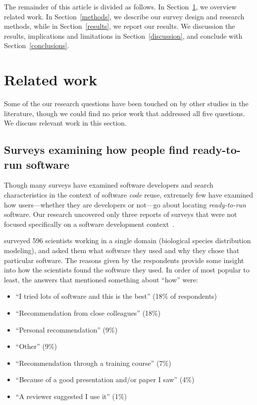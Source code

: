 \documentclass[review]{elsarticle}
\begin{document}
The remainder of this article is divided as follows. In Section~\ref{related-work}, we overview related work.  In Section~\ref{methods}, we describe our survey design and research methods, while in Section~\ref{results}, we report our results.  We discussion the results, implications and limitations in Section~\ref{discussion}, and conclude with Section~\ref{conclusions}.


\section{Related work}
\label{related-work}

Some of the our research questions have been touched on by other studies in the literature, though we could find no prior work that addressed all five questions.  We discuss relevant work in this section.


\subsection{Surveys examining how people find ready-to-run software}

Though many surveys have examined software developers and search characteristics in the context of software \emph{code} reuse, extremely few have examined how users---whether they are developers or not---go about locating \emph{ready-to-run} software.  Our research uncovered only three reports of surveys that were not focused specifically on a software development context~\citep{joppa2013troubling, huang2013provenance, lawrence2015science}.

\citet{joppa2013troubling} surveyed 596 scientists working in a single domain (biological species distribution modeling), and asked them what software they used and why they chose that particular software.  The reasons given by the respondents provide some insight into how the scientists found the software they used.  In order of most popular to least, the answers that mentioned something about ``how'' were:

\begin{itemize}[itemsep=-0.5ex]

\item ``I tried lots of software and this is the best'' (18\% of respondents)
\item ``Recommendation from close colleagues'' (18\%)
\item ``Personal recommendation'' (9\%)
\item ``Other'' (9\%)
\item ``Recommendation through a training course'' (7\%)
\item ``Because of a good presentation and/or paper I saw'' (4\%)
\item ``A reviewer suggested I use it'' (1\%)

\end{itemize}
\end{document}
